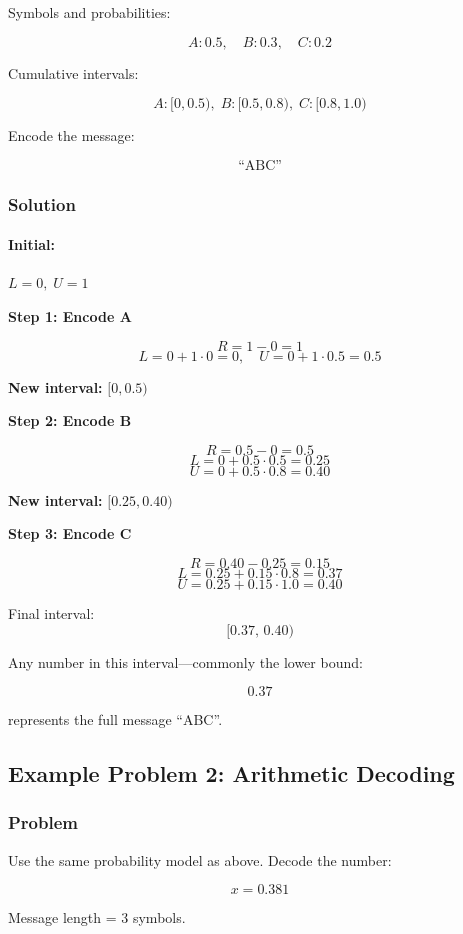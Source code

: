 \documentclass{AnantDocumentation}
\begin{document}
Symbols and probabilities:

\[
A:0.5,\quad B:0.3,\quad C:0.2
\]

Cumulative intervals:

\[
A:[0,0.5),\; B:[0.5,0.8),\; C:[0.8,1.0)
\]

Encode the message:

\[
\text{``ABC''}
\]

\subsubsection*{Solution}

\paragraph{Initial:} \(L=0,\; U=1\)

\textbf{Step 1: Encode A}

\[
R = 1-0 = 1
\]
\[
L = 0 + 1\cdot 0 = 0,\quad U = 0 + 1\cdot 0.5 = 0.5
\]

\textbf{New interval:} \([0, 0.5)\)

\textbf{Step 2: Encode B}

\[
R = 0.5 - 0 = 0.5
\]
\[
L = 0 + 0.5\cdot 0.5 = 0.25
\]
\[
U = 0 + 0.5\cdot 0.8 = 0.40
\]

\textbf{New interval:} \([0.25, 0.40)\)

\textbf{Step 3: Encode C}

\[
R = 0.40 - 0.25 = 0.15
\]
\[
L = 0.25 + 0.15\cdot 0.8 = 0.37
\]
\[
U = 0.25 + 0.15\cdot 1.0 = 0.40
\]

Final interval:
\[
[0.37,\, 0.40)
\]

Any number in this interval—commonly the lower bound:

\[
\boxed{0.37}
\]

represents the full message “ABC”.

\subsection{Example Problem 2: Arithmetic Decoding}

\subsubsection*{Problem}

Use the same probability model as above.  
Decode the number:

\[
x = 0.381
\]

Message length = 3 symbols.
\end{document}
